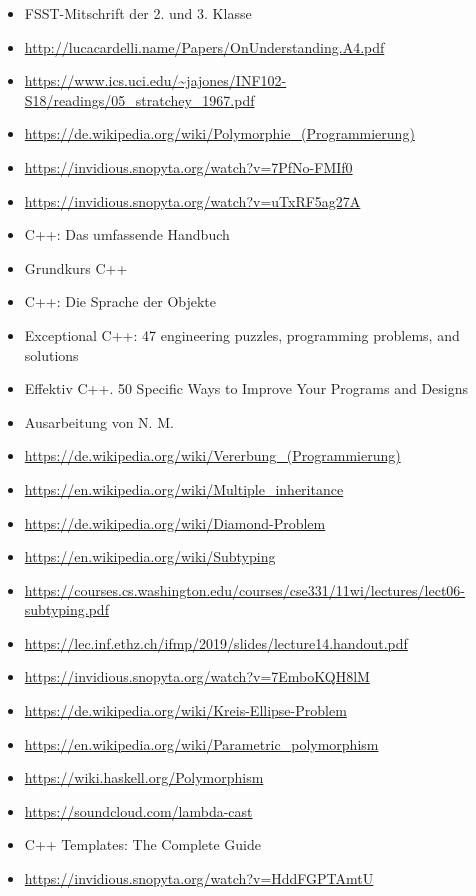 \begin{itemize}
	\item FSST-Mitschrift der 2. und 3. Klasse
	\item \url{http://lucacardelli.name/Papers/OnUnderstanding.A4.pdf}
	\item \url{https://www.ics.uci.edu/~jajones/INF102-S18/readings/05_stratchey_1967.pdf}
	\item \url{https://de.wikipedia.org/wiki/Polymorphie_(Programmierung)}
	\item \url{https://invidious.snopyta.org/watch?v=7PfNo-FMIf0}
	\item \url{https://invidious.snopyta.org/watch?v=uTxRF5ag27A}
	\item C++: Das umfassende Handbuch
	\item Grundkurs C++
	\item C++: Die Sprache der Objekte
	\item Exceptional C++: 47 engineering puzzles, programming problems, and solutions
	\item Effektiv C++. 50 Specific Ways to Improve Your Programs and Designs
	
	\item Ausarbeitung von N. M.
	
	\item \url{https://de.wikipedia.org/wiki/Vererbung_(Programmierung)}
	\item \url{https://en.wikipedia.org/wiki/Multiple_inheritance}
	\item \url{https://de.wikipedia.org/wiki/Diamond-Problem}
	
	\item \url{https://en.wikipedia.org/wiki/Subtyping}
	\item \url{https://courses.cs.washington.edu/courses/cse331/11wi/lectures/lect06-subtyping.pdf}
	\item \url{https://lec.inf.ethz.ch/ifmp/2019/slides/lecture14.handout.pdf}
	\item \url{https://invidious.snopyta.org/watch?v=7EmboKQH8lM}
	\item \url{https://de.wikipedia.org/wiki/Kreis-Ellipse-Problem}
	
	\item \url{https://en.wikipedia.org/wiki/Parametric_polymorphism}
	\item \url{https://wiki.haskell.org/Polymorphism}
	\item \url{https://soundcloud.com/lambda-cast}
	\item C++ Templates: The Complete Guide
	\item \url{https://invidious.snopyta.org/watch?v=HddFGPTAmtU}
	

\end{itemize}
